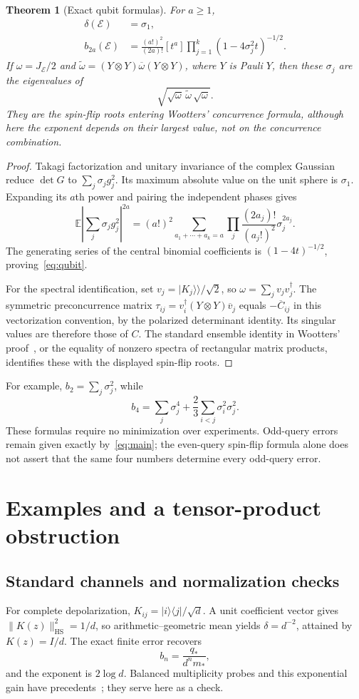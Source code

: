 \documentclass[11pt,a4paper]{article}
\newtheorem{theorem}{Theorem}[section]
\theoremstyle{remark}\newtheorem{remark}[theorem]{Remark}
\newcommand{\E}{\mathcal E}
\newcommand{\EE}{\mathbb E}
\newcommand{\ket}[1]{\lvert #1\rangle}
\newcommand{\bra}[1]{\langle #1\rvert}
\newcommand{\vket}[1]{\lvert #1\rangle\!\rangle}
\newcommand{\HS}{\mathrm{HS}}
\begin{document}
\begin{theorem}[Exact qubit formulas]\label{thm:qubit}
For $a\ge1$,
\begin{align}
\delta(\E)&=\sigma_1,\\
b_{2a}(\E)&=\frac{(a!)^2}{(2a)!}[t^a]
\prod_{j=1}^k(1-4\sigma_j^2t)^{-1/2}.
\label{eq:qubit}
\end{align}
If $\omega=J_\E/2$ and $\widetilde\omega=(Y\otimes Y)\overline\omega(Y\otimes Y)$, where $Y$ is Pauli $Y$, then these $\sigma_j$ are the eigenvalues of
\[
\sqrt{\sqrt\omega\,\widetilde\omega\,\sqrt\omega}.
\]
They are the spin-flip roots entering Wootters' concurrence formula, although here the exponent depends on their largest value, not on the concurrence combination.
\end{theorem}
\begin{proof}
Takagi factorization and unitary invariance of the complex Gaussian reduce $\det G$ to $\sum_j\sigma_jg_j^2$. Its maximum absolute value on the unit sphere is $\sigma_1$. Expanding its $a$th power and pairing the independent phases gives
\[
\EE\left|\sum_j\sigma_jg_j^2\right|^{2a}
=(a!)^2\sum_{a_1+\cdots+a_k=a}\prod_j
\frac{(2a_j)!}{(a_j!)^2}\sigma_j^{2a_j}.
\]
The generating series of the central binomial coefficients is $(1-4t)^{-1/2}$, proving~\eqref{eq:qubit}.

For the spectral identification, set $v_j=\vket{K_j}/\sqrt2$, so $\omega=\sum_jv_jv_j^\dagger$. The symmetric preconcurrence matrix $\tau_{ij}=v_i^\dagger(Y\otimes Y)\overline v_j$ equals $-\overline C_{ij}$ in this vectorization convention, by the polarized determinant identity. Its singular values are therefore those of $C$. The standard ensemble identity in Wootters' proof~\cite{wootters}, or the equality of nonzero spectra of rectangular matrix products, identifies these with the displayed spin-flip roots.
\end{proof}

For example, $b_2=\sum_j\sigma_j^2$, while
\[
b_4=\sum_j\sigma_j^4+\frac23\sum_{i<j}\sigma_i^2\sigma_j^2.
\]
These formulas require no minimization over experiments. Odd-query errors remain given exactly by~\eqref{eq:main}; the even-query spin-flip formula alone does not assert that the same four numbers determine every odd-query error.

\section{Examples and a tensor-product obstruction}\label{sec:examples}
\subsection{Standard channels and normalization checks}
For complete depolarization, $K_{ij}=\ket i\bra j/\sqrt d$. A unit coefficient vector gives $\|K(z)\|_\HS^2=1/d$, so arithmetic--geometric mean yields $\delta=d^{-2}$, attained by $K(z)=I/d$. The exact finite error recovers
\[
b_n=\frac{q_*}{d^n m_*},
\]
and the exponent is $2\log d$. Balanced multiplicity probes and this exponential gain have precedents~\cite{chiribella}; they serve here as a check.
\end{document}
